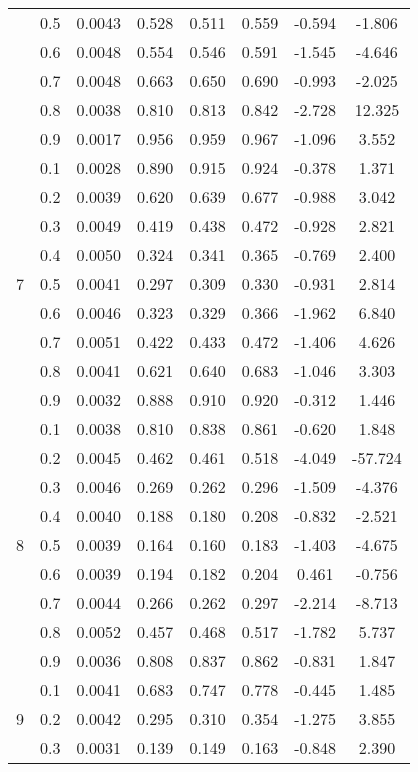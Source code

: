 \documentclass[11pt,a4paper]{report}
\begin{document}
\begin{longtable}{ | c | c || c | c | c | c | c | c | }
 & 0.5 & 0.0043 & 0.528 & 0.511 & 0.559 & -0.594 & -1.806 \\
 & 0.6 & 0.0048 & 0.554 & 0.546 & 0.591 & -1.545 & -4.646 \\
 & 0.7 & 0.0048 & 0.663 & 0.650 & 0.690 & -0.993 & -2.025 \\
 & 0.8 & 0.0038 & 0.810 & 0.813 & 0.842 & -2.728 & 12.325 \\
 & 0.9 & 0.0017 & 0.956 & 0.959 & 0.967 & -1.096 & 3.552 \\
 \hline
\multirow{9}{*}{7} & 0.1 & 0.0028 & 0.890 & 0.915 & 0.924 & -0.378 & 1.371 \\
 & 0.2 & 0.0039 & 0.620 & 0.639 & 0.677 & -0.988 & 3.042 \\
 & 0.3 & 0.0049 & 0.419 & 0.438 & 0.472 & -0.928 & 2.821 \\
 & 0.4 & 0.0050 & 0.324 & 0.341 & 0.365 & -0.769 & 2.400 \\
 & 0.5 & 0.0041 & 0.297 & 0.309 & 0.330 & -0.931 & 2.814 \\
 & 0.6 & 0.0046 & 0.323 & 0.329 & 0.366 & -1.962 & 6.840 \\
 & 0.7 & 0.0051 & 0.422 & 0.433 & 0.472 & -1.406 & 4.626 \\
 & 0.8 & 0.0041 & 0.621 & 0.640 & 0.683 & -1.046 & 3.303 \\
 & 0.9 & 0.0032 & 0.888 & 0.910 & 0.920 & -0.312 & 1.446 \\
 \hline
\multirow{9}{*}{8} & 0.1 & 0.0038 & 0.810 & 0.838 & 0.861 & -0.620 & 1.848 \\
 & 0.2 & 0.0045 & 0.462 & 0.461 & 0.518 & -4.049 & -57.724 \\
 & 0.3 & 0.0046 & 0.269 & 0.262 & 0.296 & -1.509 & -4.376 \\
 & 0.4 & 0.0040 & 0.188 & 0.180 & 0.208 & -0.832 & -2.521 \\
 & 0.5 & 0.0039 & 0.164 & 0.160 & 0.183 & -1.403 & -4.675 \\
 & 0.6 & 0.0039 & 0.194 & 0.182 & 0.204 & 0.461 & -0.756 \\
 & 0.7 & 0.0044 & 0.266 & 0.262 & 0.297 & -2.214 & -8.713 \\
 & 0.8 & 0.0052 & 0.457 & 0.468 & 0.517 & -1.782 & 5.737 \\
 & 0.9 & 0.0036 & 0.808 & 0.837 & 0.862 & -0.831 & 1.847 \\
 \hline
\multirow{9}{*}{9} & 0.1 & 0.0041 & 0.683 & 0.747 & 0.778 & -0.445 & 1.485 \\
 & 0.2 & 0.0042 & 0.295 & 0.310 & 0.354 & -1.275 & 3.855 \\
 & 0.3 & 0.0031 & 0.139 & 0.149 & 0.163 & -0.848 & 2.390 \\

\end{longtable}
\end{document}
